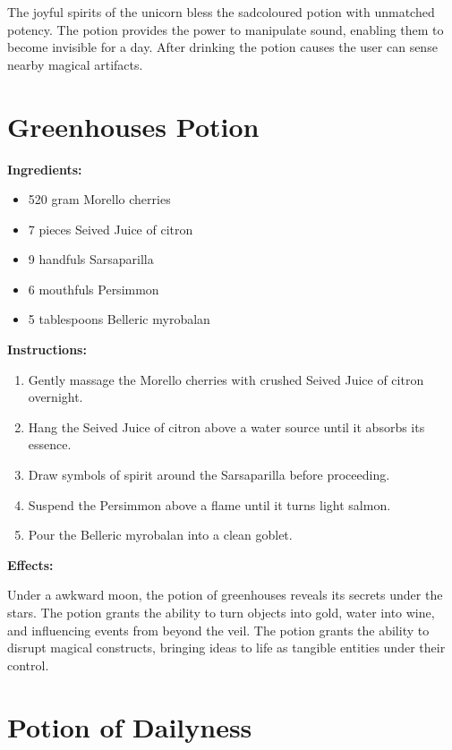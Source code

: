 \documentclass{article}
\begin{document}
The joyful spirits of the unicorn bless the sadcoloured potion with unmatched potency. The potion provides the power to manipulate sound, enabling them to become invisible for a day. After drinking the potion causes the user can sense nearby magical artifacts.

\newpage
\section*{Greenhouses Potion}

\textbf{Ingredients:}

\begin{itemize}
  \item 520 gram Morello cherries
  \item 7 pieces Seived Juice of citron
  \item 9 handfuls Sarsaparilla
  \item 6 mouthfuls Persimmon
  \item 5 tablespoons Belleric myrobalan
\end{itemize}

\textbf{Instructions:}

\begin{enumerate}
  \item Gently massage the Morello cherries with crushed Seived Juice of citron overnight.
  \item Hang the Seived Juice of citron above a water source until it absorbs its essence.
  \item Draw symbols of spirit around the Sarsaparilla before proceeding.
  \item Suspend the Persimmon above a flame until it turns light salmon.
  \item Pour the Belleric myrobalan into a clean goblet.
\end{enumerate}

\textbf{Effects:}

Under a awkward moon, the potion of greenhouses reveals its secrets under the stars. The potion grants the ability to turn objects into gold, water into wine, and influencing events from beyond the veil. The potion grants the ability to disrupt magical constructs, bringing ideas to life as tangible entities under their control.

\newpage
\section*{Potion of Dailyness}
\end{document}
